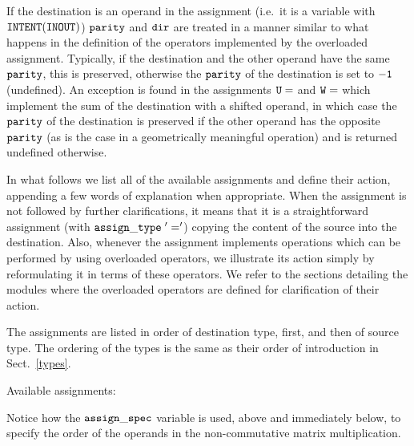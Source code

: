 If the destination is an operand in
the assignment (i.e.~it is a variable with $\tt INTENT(INOUT)$)
$\tt parity$ and $\tt dir$ are treated in a manner similar to
what happens in the definition of the operators implemented by the
overloaded assignment.  Typically, if the destination and the
other operand have the same $\tt parity$, this is preserved, otherwise
the $\tt parity$ of the destination is set to $\tt -1$ (undefined).
An exception is found in the assignments $\tt U=$ and $\tt W=$
which implement the sum of the destination with a shifted operand,
in which case the $\tt parity$ of the destination is preserved
if the other operand has the opposite $\tt parity$ (as is the
case in a geometrically meaningful operation) and is returned
undefined otherwise.

In what follows we list all of the available assignments 
and define their action,
appending a few words of explanation when appropriate.  
When the assignment is not followed by further clarifications,
it means that it is a straightforward assignment 
(with $\tt assign\_type \; '='$) copying  
the content of the source into the destination.  Also, whenever the 
assignment implements operations which can be performed by using
overloaded operators, we illustrate its action
simply by reformulating it in terms of these operators.  We refer to the
sections detailing the modules where the overloaded operators
are defined for clarification of their action.

The assignments are listed in order of destination type, first,
and then of source type. The ordering of the types is the same as
their order of introduction in Sect.~\ref{types}. 

Available assignments:






Notice how the $\tt assign\_spec$ variable is used, above and
immediately below, to specify the
order of the operands in the non-commutative matrix multiplication.



